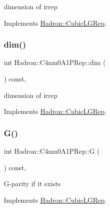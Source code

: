 dimension of irrep 

Implements \mbox{\hyperlink{structHadron_1_1CubicLGRep_a3acbaea26503ed64f20df693a48e4cdd}{Hadron\+::\+Cubic\+L\+G\+Rep}}.

\mbox{\label{structHadron_1_1C4nm0A1PRep_aabd15e62bba41adfc55ddc92338d88e5}} 
\subsubsection{\texorpdfstring{dim()}{dim()}\hspace{0.1cm}{\footnotesize\ttfamily [3/3]}}
{\footnotesize\ttfamily int Hadron\+::\+C4nm0\+A1\+P\+Rep\+::dim (\begin{DoxyParamCaption}{ }\end{DoxyParamCaption}) const\hspace{0.3cm}{\ttfamily [inline]}, {\ttfamily [virtual]}}

dimension of irrep 

Implements \mbox{\hyperlink{structHadron_1_1CubicLGRep_a3acbaea26503ed64f20df693a48e4cdd}{Hadron\+::\+Cubic\+L\+G\+Rep}}.

\mbox{\label{structHadron_1_1C4nm0A1PRep_a052b607d24099af097a92cb8c1191a1e}} 
\subsubsection{\texorpdfstring{G()}{G()}\hspace{0.1cm}{\footnotesize\ttfamily [1/3]}}
{\footnotesize\ttfamily int Hadron\+::\+C4nm0\+A1\+P\+Rep\+::G (\begin{DoxyParamCaption}{ }\end{DoxyParamCaption}) const\hspace{0.3cm}{\ttfamily [inline]}, {\ttfamily [virtual]}}

G-\/parity if it exists 

Implements \mbox{\hyperlink{structHadron_1_1CubicLGRep_ace26f7b2d55e3a668a14cb9026da5231}{Hadron\+::\+Cubic\+L\+G\+Rep}}.

\mbox{\label{structHadron_1_1C4nm0A1PRep_a052b607d24099af097a92cb8c1191a1e}} 
